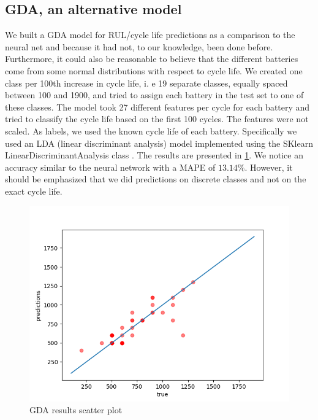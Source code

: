\documentclass{article}
\begin{document}
\subsection{GDA, an alternative model}
We built a GDA model for RUL/cycle life predictions as a comparison to the neural net and because it had not, to our knowledge, been done before. Furthermore, it could also be reasonable to believe that the different batteries come from some normal distributions with respect to cycle life. We created one class per 100th increase in cycle life, i. e 19 separate classes, equally spaced between 100 and 1900, and tried to assign each battery in the test set to one of these classes. The model took 27 different features per cycle for each battery and tried to classify the cycle life based on the first 100 cycles. The features were not scaled. As labels, we used the known cycle life of each battery. Specifically we used an LDA (linear discriminant analysis) model implemented using the SKlearn LinearDiscriminantAnalysis class \cite{scikit-learn}. The results are presented in \ref{fig:GDA_scatter}. We notice an accuracy similar to the neural network with a MAPE of $13.14\%$. However, it should be emphasized that we did predictions on discrete classes and not on the exact cycle life.

\begin{figure}[H]
    \centering
    \includegraphics[scale=0.6]{figs/GDA scatter plot.png}
    \caption{GDA results scatter plot}
    \label{fig:GDA_scatter}
\end{figure}


\end{document}

